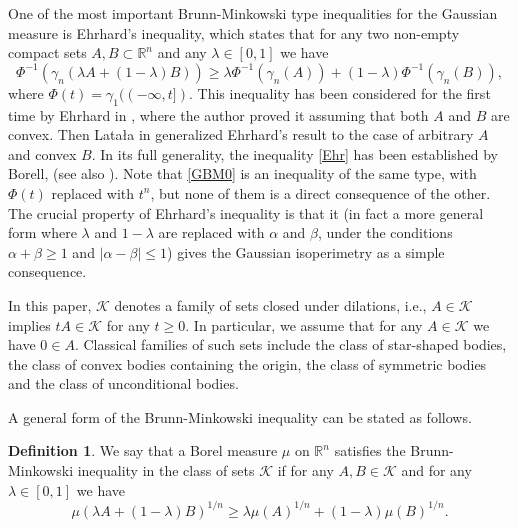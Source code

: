 \documentclass[11pt]{article}
\newcommand{\mb}[1]{\mathbb{{#1}}}
\newcommand{\mc}[1]{\mathcal{{#1}}}
\newcommand{\1}{\mathbf{{1}}}
\theoremstyle{definition}
\newtheorem{defi}{Definition}
\begin{document}
One of the most important Brunn-Minkowski type inequalities for the Gaussian measure is Ehrhard's inequality, which states that for any two non-empty compact sets $A,B \subset \mb{R}^n$ and any $\lambda \in [0,1]$ we have
\begin{equation}\label{Ehr}
	\Phi^{-1}(\gamma_n(\lambda A + (1-\lambda)B)) \geq \lambda \Phi^{-1}(\gamma_n(A)) + (1-\lambda)\Phi^{-1}(\gamma_n(B)),
\end{equation}
where $\Phi(t)=\gamma_1((-\infty,t])$.
This inequality has been considered for the first time by Ehrhard in \cite{E}, where the author proved it assuming that both $A$ and $B$ are convex. Then Lata{\l}a in \cite{L1} generalized Ehrhard's result to the case of arbitrary $A$ and convex $B$. In its full  generality, the inequality \eqref{Ehr} has been established by Borell, \cite{B3} (see also \cite{Ba}). Note that \eqref{GBM0}  is an inequality of the same type, with $\Phi(t)$ replaced with $t^n$, but none of them is a direct consequence of the other.  The crucial property of  Ehrhard's inequality is that it (in fact a more general form where $\lambda$ and $1-\lambda$ are replaced with $\alpha$ and $\beta$, under the conditions $\alpha+\beta \geq 1$ and $|\alpha-\beta|\leq 1$) gives the Gaussian isoperimetry as a simple consequence.

In this paper, $\mc{K}$ denotes a family of sets closed under dilations, i.e., $A \in \mc{K}$ implies $tA \in \mc{K}$ for any $t \ge 0$. In particular, we assume that for any $A \in \mc{K}$ we have $0 \in A$. Classical families of such sets include the class of star-shaped bodies, the class of convex bodies containing the origin, the class of symmetric bodies and the class of unconditional bodies.

A general form of the Brunn-Minkowski inequality can be stated as follows.

\begin{defi}
We say that a Borel measure $\mu$ on $\mb{R}^n$ satisfies the Brunn-Minkowski inequality in the class of sets $\mc{K}$ if for any $A,B \in \mc{K}$ and for any $\lambda \in [0,1]$ we have
\begin{equation}\label{BM}
	\mu(\lambda A + (1-\lambda)B)^{1/n} \geq \lambda \mu(A)^{1/n} +   (1-\lambda) \mu(B)^{1/n}.
\end{equation}
\end{defi}
\end{document}
